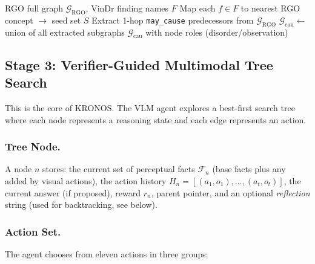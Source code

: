 \documentclass[runningheads]{llncs}
\begin{document}
\begin{algorithm}[t]
\caption{Causal KG Construction from RGO}
\label{alg:kg_build}
\begin{algorithmic}[1]
\REQUIRE RGO full graph $\mathcal{G}_{\text{RGO}}$, VinDr finding names $F$
\STATE Map each $f \in F$ to nearest RGO concept $\to$ seed set $S$
  \STATE Extract 1-hop \texttt{may\_cause} predecessors from $\mathcal{G}_{\text{RGO}}$
\ENDFOR
\STATE $\mathcal{G}_{\text{cau}} \gets$ union of all extracted subgraphs
\RETURN $\mathcal{G}_{\text{cau}}$ with node roles (disorder/observation)
\end{algorithmic}
\end{algorithm}


\subsection{Stage 3: Verifier-Guided Multimodal Tree Search}
\label{sec:tree_search}

This is the core of KRONOS.
The VLM agent explores a best-first search tree where each node represents
a reasoning state and each edge represents an action.

\subsubsection{Tree Node.}
A node $n$ stores: the current set of perceptual facts
$\mathcal{F}_n$ (base facts plus any added by visual actions), the action
history $H_n = [(a_1, o_1), \ldots, (a_t, o_t)]$, the current answer (if
proposed), reward $r_n$, parent pointer, and an optional \emph{reflection}
string (used for backtracking, see below).

\subsubsection{Action Set.}
The agent chooses from eleven actions in three groups:
\end{document}
